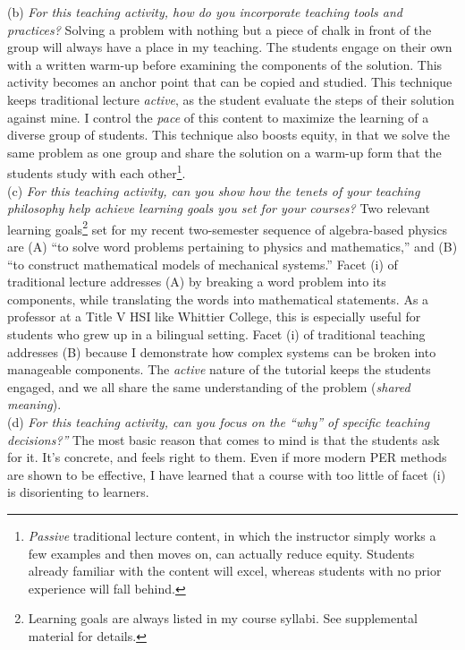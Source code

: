 \documentclass[../../../main.tex]{subfiles}
\begin{document}
(b) \textit{For this teaching activity, how do you incorporate teaching tools and practices?}  Solving a problem with nothing but a piece of chalk in front of the group will always have a place in my teaching.  The students engage on their own with a written warm-up before examining the components of the solution.  This activity becomes an anchor point that can be copied and studied.  This technique keeps traditional lecture \textit{active}, as the student evaluate the steps of their solution against mine.  I control the \textit{pace} of this content to maximize the learning of a diverse group of students.  This technique also boosts equity, in that we solve the same problem as one group and share the solution on a warm-up form that the students study with each other\footnote{\textit{Passive} traditional lecture content, in which the instructor simply works a few examples and then moves on, can actually reduce equity.  Students already familiar with the content will excel, whereas students with no prior experience will fall behind.}.
\\
\vspace{0.25cm}
(c) \textit{For this teaching activity, can you show how the tenets of your teaching philosophy help achieve learning goals you set for your courses?} Two relevant learning goals\footnote{Learning goals are always listed in my course syllabi.  See supplemental material for details.} set for my recent two-semester sequence of algebra-based physics are (A) ``to solve word problems pertaining to physics and mathematics,'' and (B) ``to construct mathematical models of mechanical systems.''  Facet (i) of traditional lecture addresses (A) by breaking a word problem into its components, while translating the words into mathematical statements.  As a professor at a Title V HSI like Whittier College, this is especially useful for students who grew up in a bilingual setting.  Facet (i) of traditional teaching addresses (B) because I demonstrate how complex systems can be broken into manageable components.  The \textit{active} nature of the tutorial keeps the students engaged, and we all share the same understanding of the problem (\textit{shared meaning}).
\\
\vspace{0.25cm}
(d) \textit{For this teaching activity, can you focus on the ``why'' of specific teaching decisions?''}  The most basic reason that comes to mind is that the students ask for it.  It's concrete, and feels right to them.  Even if more modern PER methods are shown to be effective, I have learned that a course with too little of facet (i) is disorienting to learners.
\end{document}
